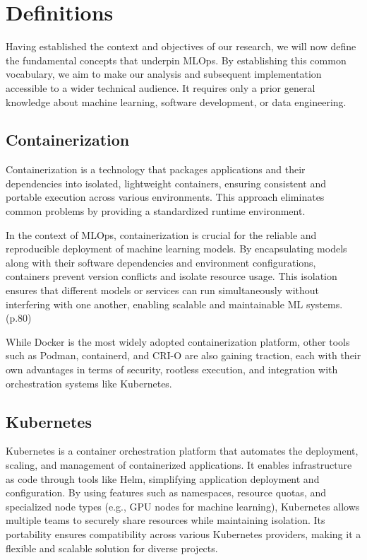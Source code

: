 \section{Definitions}\label{sec:definitions}

Having established the context and objectives of our research, we will now define the fundamental concepts that underpin MLOps.
By establishing this common vocabulary, we aim to make our analysis and subsequent implementation accessible to a wider technical audience.
It requires only a prior general knowledge about machine learning, software development, or data engineering.

\subsection{Containerization}\label{subsec:containerization}

Containerization is a technology that packages applications and their dependencies into isolated, lightweight containers,
ensuring consistent and portable execution across various environments.
This approach eliminates common problems by providing a standardized runtime environment.

In the context of MLOps, containerization is crucial for the reliable and reproducible deployment of machine learning models.
By encapsulating models along with their software dependencies and environment configurations, containers prevent version conflicts and isolate resource usage.
This isolation ensures that different models or services can run simultaneously without interfering with one another,
enabling scalable and maintainable ML systems.\cite{treveil2020introducing}(p.80)

While Docker\cite{docker} is the most widely adopted containerization platform, other tools such as Podman, containerd,
and CRI-O are also gaining traction, each with their own advantages in terms of security, rootless execution,
and integration with orchestration systems like Kubernetes.


\subsection{Kubernetes}\label{subsec:kubernetes2}

Kubernetes\cite{kubernetes} is a container orchestration platform that automates the deployment, scaling, and management of containerized applications.
It enables infrastructure as code through tools like Helm, simplifying application deployment and configuration.
By using features such as namespaces, resource quotas, and specialized node types (e.g., GPU nodes for machine learning),
Kubernetes allows multiple teams to securely share resources while maintaining isolation.
Its portability ensures compatibility across various Kubernetes providers, making it a flexible and scalable solution for diverse projects.

